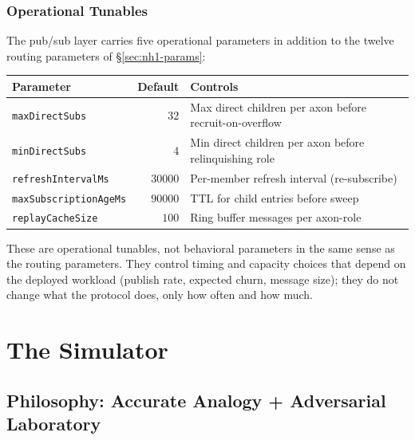 \documentclass[twoside,nobib]{tufte-book}
\begin{document}
\section{Operational Tunables}

The pub/sub layer carries five operational parameters in addition
to the twelve routing parameters of \S\ref{sec:nh1-params}:

\begin{table}[h]
\small
\begin{tabular}{@{}lrl@{}}
\toprule
\textbf{Parameter} & \textbf{Default} & \textbf{Controls} \\
\midrule
\texttt{maxDirectSubs} & $32$ & Max direct children per axon
  before recruit-on-overflow \\
\texttt{minDirectSubs} & $4$ & Min direct children per axon
  before relinquishing role \\
\texttt{refreshIntervalMs} & $30000$ & Per-member refresh
  interval (re-subscribe) \\
\texttt{maxSubscriptionAgeMs} & $90000$ & TTL for child entries
  before sweep \\
\texttt{replayCacheSize} & $100$ & Ring buffer messages per
  axon-role \\
\bottomrule
\end{tabular}
\end{table}

These are operational tunables, not behavioral parameters in the
same sense as the routing parameters. They control timing and
capacity choices that depend on the deployed workload (publish
rate, expected churn, message size); they do not change what the
protocol does, only how often and how much.


\part{The Simulator}


\chapter{Philosophy: Accurate Analogy + Adversarial Laboratory}
\label{ch:sim-philosophy}
\end{document}
